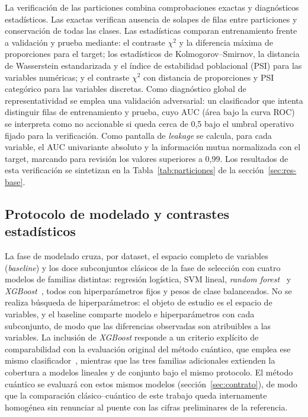 La verificación de las particiones combina comprobaciones exactas y
diagnósticos estadísticos. Las exactas verifican ausencia de solapes
de filas entre particiones y conservación de todas las clases. Las
estadísticas comparan
entrenamiento frente a validación y prueba mediante: el contraste
$\chi^2$ y la diferencia máxima de proporciones para el target; los
estadísticos de Kolmogorov--Smirnov, la distancia de Wasserstein
estandarizada y el índice de estabilidad poblacional (PSI) para las
variables numéricas; y el contraste $\chi^2$ con distancia de
proporciones y PSI categórico para las variables discretas. Como
diagnóstico global de representatividad se emplea una validación
adversarial: un clasificador que intenta distinguir filas de
entrenamiento y prueba, cuyo AUC (área bajo la curva ROC) se interpreta como no accionable si
queda cerca de 0{,}5 bajo el umbral operativo fijado para la verificación.
Como pantalla de \textit{leakage} se calcula,
para cada variable, el AUC univariante absoluto y la información mutua
normalizada con el target, marcando para revisión los valores
superiores a 0{,}99. Los resultados de esta verificación se sintetizan en la
Tabla~\ref{tab:particiones} de la sección~\ref{sec:res-base}.

\subsection{Protocolo de modelado y contrastes estadísticos}
\label{sec:protocolo}

La fase de modelado cruza, por dataset, el espacio completo de
variables (\textit{baseline}) y los doce subconjuntos clásicos de
la fase de selección con cuatro modelos de familias distintas:
regresión logística, SVM lineal, \textit{random
forest}~\cite{breiman2001} y \textit{XGBoost}~\cite{chen2016}, todos
con hiperparámetros fijos y pesos de clase balanceados. No se realiza
búsqueda de hiperparámetros: el objeto de estudio es el espacio de
variables, y el baseline comparte modelo e hiperparámetros con cada
subconjunto, de modo que las diferencias observadas son atribuibles a
las variables. La inclusión de \textit{XGBoost} responde a un criterio
explícito de comparabilidad con la evaluación original del método
cuántico, que emplea ese mismo clasificador~\cite{orquin2026}, mientras
que las tres familias adicionales extienden la cobertura a modelos
lineales y de conjunto bajo el mismo protocolo. El método cuántico se
evaluará con estos mismos modelos (sección~\ref{sec:contrato}), de modo
que la comparación clásico--cuántico de este trabajo queda
internamente homogénea sin renunciar al puente con las cifras
preliminares de la referencia.

